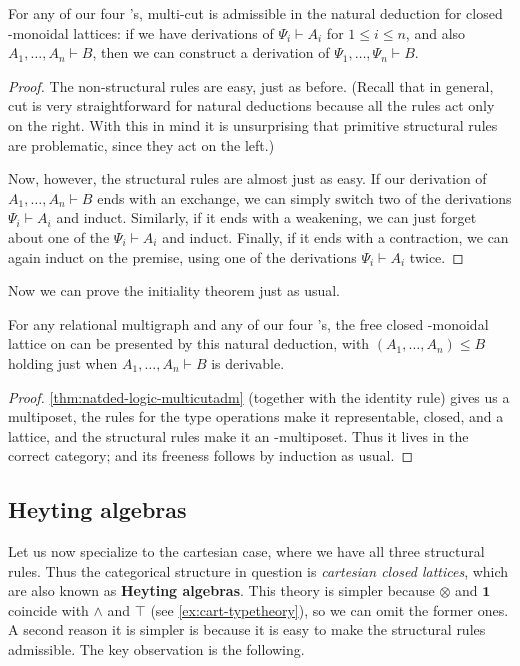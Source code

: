 \documentclass{book}
\let\types\vdash
\let\meet\wedge
\def\one{\mathbf{1}}
\let\tensor\otimes
\begin{document}
\begin{lem}\label{thm:natded-logic-multicutadm}
  For any of our four \fS's, multi-cut is admissible in the natural deduction for closed \fS-monoidal lattices: if we have derivations of $\Psi_i\types A_i$ for $1\le i\le n$, and also $A_1,\dots,A_n \types B$, then we can construct a derivation of $\Psi_1,\dots,\Psi_n\types B$.
\end{lem}
\begin{proof}
  The non-structural rules are easy, just as before.
  (Recall that in general, cut is very straightforward for natural deductions because all the rules act only on the right.
  With this in mind it is unsurprising that primitive structural rules are problematic, since they act on the left.)

  Now, however, the structural rules are almost just as easy.
  If our derivation of $A_1,\dots,A_n \types B$ ends with an exchange, we can simply switch two of the derivations $\Psi_i\types A_i$ and induct.
  Similarly, if it ends with a weakening, we can just forget about one of the $\Psi_i\types A_i$ and induct.
  Finally, if it ends with a contraction, we can again induct on the premise, using one of the derivations $\Psi_i\types A_i$ twice.
\end{proof}

Now we can prove the initiality theorem just as usual.

\begin{thm}\label{thm:natded-logic-initial}
  For any relational multigraph \cG and any of our four \fS's, the free closed \fS-monoidal lattice on \cG can be presented by this natural deduction, with $(A_1,\dots,A_n)\le B$ holding just when $A_1,\dots,A_n\types B$ is derivable.
\end{thm}
\begin{proof}
  \cref{thm:natded-logic-multicutadm} (together with the identity rule) gives us a multiposet, the rules for the type operations make it representable, closed, and a lattice, and the structural rules make it an \fS-multiposet.
  Thus it lives in the correct category; and its freeness follows by induction as usual.
\end{proof}


\subsection{Heyting algebras}
\label{sec:heyting-algebras}

Let us now specialize to the cartesian case, where we have all three structural rules.
Thus the categorical structure in question is \emph{cartesian closed lattices}, which are also known as \textbf{Heyting algebras}.
This theory is simpler because $\tensor$ and $\one$ coincide with $\meet$ and $\top$ (see \cref{ex:cart-typetheory}), so we can omit the former ones.
A second reason it is simpler is because it is easy to make the structural rules admissible.
The key observation is the following.
\end{document}
